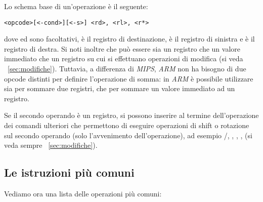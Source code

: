 \documentclass[class=book, crop=false, oneside]{standalone}
\begin{document}
Lo schema base di un'operazione è il seguente:
\begin{center}
	\texttt{<opcode>[<-cond>][<-s>] <rd>, <rl>, <r*>}
\end{center}
dove  ed  sono facoltativi,  è il registro di destinazione,  è il registro di sinistra e  è il registro di destra. Si noti inoltre che  può essere sia un registro che un valore immediato che un registro su cui si effettuano operazioni di modifica (si veda ~\ref{sec:modifiche}). Tuttavia, a differenza di \emph{MIPS}, \emph{ARM} non ha bisogno di due opcode distinti per definire l'operazione di somma: in \emph{ARM} è possibile utilizzare  sia per sommare due registri, che per sommare un valore immediato ad un registro.

Se il secondo operando è un registro, si possono inserire al termine dell'operazione dei comandi ulteriori che permettono di eseguire operazioni di shift o rotazione sul secondo operando (solo l'avvenimento dell'operazione), ad esempio /, , , ,  (si veda sempre ~\ref{sec:modifiche}).

\subsection*{Le istruzioni più comuni}
Vediamo ora una lista delle operazioni più comuni:
\end{document}

